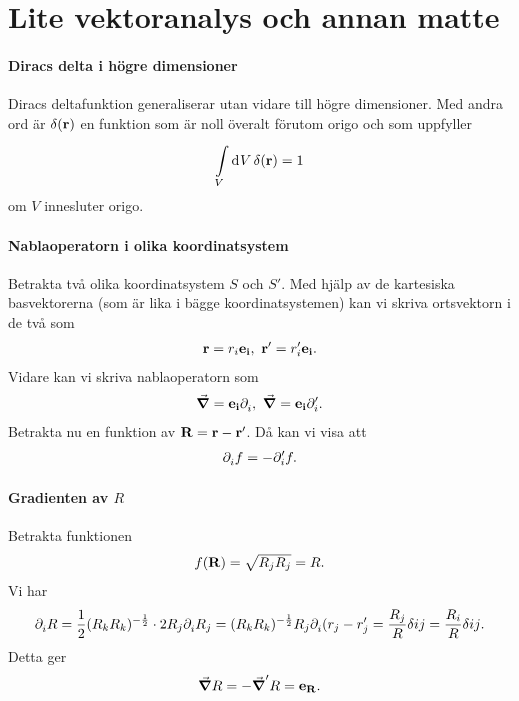 \section{Lite vektoranalys och annan matte}

\paragraph{Diracs delta i högre dimensioner}
Diracs deltafunktion generaliserar utan vidare till högre dimensioner. Med andra ord är $\delta(\vb{r})$ en funktion som är noll överalt förutom origo och som uppfyller
\begin{align*}
	\int\limits_{V}^{}\dd[]{V}\delta(\vb{r}) = 1
\end{align*}
om $V$ innesluter origo.

\paragraph{Nablaoperatorn i olika koordinatsystem}
Betrakta två olika koordinatsystem $S$ och $S'$. Med hjälp av de kartesiska basvektorerna (som är lika i bägge koordinatsystemen) kan vi skriva ortsvektorn i de två som
\begin{align*}
	\vb{r} = r_{i}\vb{e}_{\vb{i}},\ \vb{r}' = r_{i}'\vb{e}_{\vb{i}}.
\end{align*}
Vidare kan vi skriva nablaoperatorn som
\begin{align*}
	\grad{} = \vb{e}_{\vb{i}}\partial_{i}^{},\ \grad{} = \vb{e}_{\vb{i}}\partial_{i}'.
\end{align*}
Betrakta nu en funktion av $\vb{R} = \vb{r} - \vb{r}'$. Då kan vi visa att
\begin{align*}
	\partial_{i}^{}f = -\partial_{i}'f.
\end{align*}

\paragraph{Gradienten av $R$}
Betrakta funktionen
\begin{align*}
	f(\vb{R}) = \sqrt{R_{j}R_{j}} = R.
\end{align*}
Vi har
\begin{align*}
	\partial_{i}^{}R = \frac{1}{2}(R_{k}R_{k})^{-\frac{1}{2}}\cdot 2R_{j}\partial_{i}^{}R_{j} = (R_{k}R_{k})^{-\frac{1}{2}}R_{j}\partial_{i}^{}(r_{j} - r_{j}' = \frac{R_{j}}{R}\delta{ij} = \frac{R_{i}}{R}\delta{ij}.
\end{align*}
Detta ger
\begin{align*}
	\grad{R} = -\grad'{R} = \vb{e}_{\vb{\vb{R}}}.
\end{align*}

